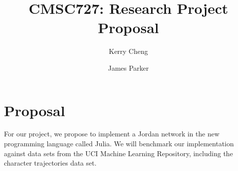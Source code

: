 \documentclass[12pt]{article}
\title{CMSC727: Research Project Proposal}
\author{Kerry Cheng \and James Parker}
\begin{document}
\maketitle

\section{Proposal}

For our project, we propose to implement a Jordan network in the new programming language called Julia. We will benchmark our implementation against data sets from the UCI Machine Learning Repository, including the character trajectories data set.
\end{document}

